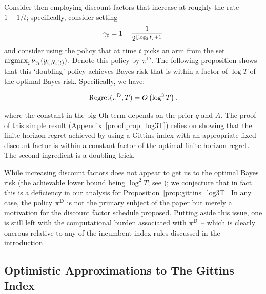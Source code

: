 Consider then employing discount factors that increase at roughly the rate $1 - 1/t$; specifically, consider setting 
\[
\gamma_t = 
1 - 
\frac{1}
{2^{\lfloor\log_2 t\rfloor+1}}
\]
and consider using the policy that at time $t$ picks an arm from the set $\operatorname*{\mathrm{argmax}}_i \nu_{\gamma_t}(y_{i,N_i(t)})$. Denote this policy by $\pi^{\rm D}$. The following proposition shows that this `doubling' policy achieves Bayes risk that is within a factor of $\log T$ of the optimal Bayes risk. Specifically, we have:
\begin{proposition}
	\label{prop:gittins_log3T}
	\[
	{\rm Regret}(\pi^{\rm D},T)
	=
	O
	\left(
	\log^3 T
	\right).
	\] 
\end{proposition}
where the constant in the big-Oh term depends on the prior $q$ and $A$. The proof of this simple result (Appendix~\ref{proof:prop_log3T}) relies on showing that the finite horizon regret achieved by using a Gittins index with an appropriate fixed discount factor is within a constant factor of the optimal finite horizon regret. The second ingredient is a doubling trick.

While increasing discount factors does not appear to get us to the optimal Bayes risk (the achievable lower bound being $\log^2T$; see \cite{lai1987adaptive}); we conjecture that in fact this is a deficiency in our analysis for Proposition~\ref{prop:gittins_log3T}. In any case, the policy $\pi^{\rm D}$ is not the primary subject of the paper but merely a motivation for the discount factor schedule proposed. Putting aside this issue, one is still left with the computational burden associated with $\pi^{\rm D}$ -- which is clearly onerous relative to any of the incumbent index rules discussed in the introduction. 

\subsection{Optimistic Approximations to The Gittins Index}\label{sec:approx_agi_deriv}

